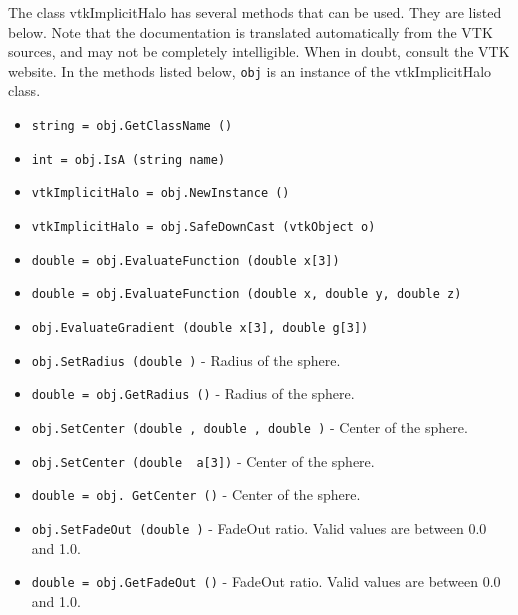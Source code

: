 The class vtkImplicitHalo has several methods that can be used.
  They are listed below.
Note that the documentation is translated automatically from the VTK sources,
and may not be completely intelligible.  When in doubt, consult the VTK website.
In the methods listed below, \verb|obj| is an instance of the vtkImplicitHalo class.
\begin{itemize}
\item  \verb|string = obj.GetClassName ()|

\item  \verb|int = obj.IsA (string name)|

\item  \verb|vtkImplicitHalo = obj.NewInstance ()|

\item  \verb|vtkImplicitHalo = obj.SafeDownCast (vtkObject o)|

\item  \verb|double = obj.EvaluateFunction (double x[3])|

\item  \verb|double = obj.EvaluateFunction (double x, double y, double z)|

\item  \verb|obj.EvaluateGradient (double x[3], double g[3])|

\item  \verb|obj.SetRadius (double )| -  Radius of the sphere.

\item  \verb|double = obj.GetRadius ()| -  Radius of the sphere.

\item  \verb|obj.SetCenter (double , double , double )| -  Center of the sphere.

\item  \verb|obj.SetCenter (double  a[3])| -  Center of the sphere.

\item  \verb|double = obj. GetCenter ()| -  Center of the sphere.

\item  \verb|obj.SetFadeOut (double )| -  FadeOut ratio. Valid values are between 0.0 and 1.0.

\item  \verb|double = obj.GetFadeOut ()| -  FadeOut ratio. Valid values are between 0.0 and 1.0.

\end{itemize}
